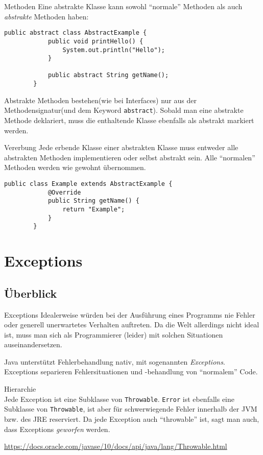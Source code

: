 \begin{frame}[fragile]{Methoden}
    Eine abstrakte Klasse kann sowohl \enquote{normale} Methoden als auch \textit{abstrakte} Methoden haben:
    \begin{lstlisting}[gobble=8]
        public abstract class AbstractExample {
            public void printHello() {
                System.out.println("Hello");
            }

            public abstract String getName();
        }
    \end{lstlisting}
    Abstrakte Methoden bestehen(wie bei Interfaces) nur aus der Methodensignatur(und dem Keyword \texttt{abstract}).
    Sobald man eine abstrakte Methode deklariert, muss die enthaltende Klasse ebenfalls als abstrakt markiert werden.
\end{frame}

\begin{frame}[fragile]{Vererbung}
    Jede erbende Klasse einer abstrakten Klasse muss entweder alle abstrakten Methoden implementieren oder selbst abstrakt sein.
    Alle \enquote{normalen} Methoden werden wie gewohnt übernommen.
    \begin{lstlisting}[gobble=8]
        public class Example extends AbstractExample {
            @Override
            public String getName() {
                return "Example";
            }
        }
    \end{lstlisting}
\end{frame}

\section{Exceptions}
\subsection{Überblick}
\begin{frame}{Exceptions}
    Idealerweise würden bei der Ausführung eines Programms nie Fehler oder generell unerwartetes Verhalten auftreten.
    Da die Welt allerdings nicht ideal ist, muss man sich als Programmierer (leider) mit solchen Situationen auseinandersetzen.

    Java unterstützt Fehlerbehandlung nativ, mit sogenannten \textit{Exceptions}.
    Exceptions separieren Fehlersituationen und -behandlung von \enquote{normalem} Code.
\end{frame}

\begin{frame}{Hierarchie}
     \\
    \smallskip
    Jede Exception ist eine Subklasse von \texttt{Throwable}.
    \texttt{Error} ist ebenfalls eine Subklasse von \texttt{Throwable}, ist aber für schwerwiegende Fehler innerhalb der JVM bzw. des JRE reserviert.
    Da jede Exception auch \enquote{throwable} ist, sagt man auch, dass Exceptions \textit{geworfen} werden.

    \scriptsize\url{https://docs.oracle.com/javase/10/docs/api/java/lang/Throwable.html}
\end{frame}

